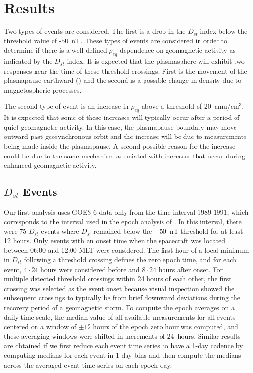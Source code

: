 \documentclass[12pt]{article}
\begin{document}
\section{Results}

Two types of events are considered. The first is a drop in the $D_{st}$ index below the threshold value of -50~nT. These types of events are considered in order to determine if there is a well-defined $\rho_{eq}$ dependence on geomagnetic activity as indicated by the $D_{st}$ index.  It is expected that the plasmasphere will exhibit two responses near the time of these threshold crossings.  First is the movement of the plasmapause earthward (\cite{LemaireEarthsPlasmasphere}) and the second is a possible change in density due to magnetospheric processes. 

The second type of event is an increase in $\rho_{eq}$ above a threshold of 20~amu/cm$^3$.  It is expected that some of these increases will typically occur after a period of quiet geomagnetic activity.  In this case, the plasmapause boundary may move outward past geosynchronous orbit and the increase will be due to measurements being made inside the plasmapause.  A second possible reason for the increase could be due to the same mechanism associated with increases that occur during enhanced geomagnetic activity.

\subsection{$D_{st}$ Events}

Our first analysis uses GOES-6 data only from the time interval 1989-1991, which corresponds to the interval used in the epoch analysis of \cite{Takahashi2010}. In this interval, there were 75 $D_{st}$ events where $D_{st}$ remained below the $-50$~nT threshold for at least 12 hours. Only events with an onset time when the spacecraft was located between 06:00 and 12:00 MLT were considered. The first hour of a local minimum in $D_{st}$ following a threshold crossing defines the zero epoch time, and for each event, $4\cdot24$ hours were considered before and $8\cdot24$ hours after onset. For multiple detected threshold crossings within 24 hours of each other, the first crossing was selected as the event onset because visual inspection showed the subsequent crossings to typically be from brief downward deviations during the recovery period of a geomagnetic storm. To compute the epoch averages on a daily time scale, the median value of all available measurements for all events centered on a window of $\pm 12$ hours of the epoch zero hour was computed, and these averaging windows were shifted in increments of $24$~hours. Similar results are obtained if we first reduce each event time series to have a 1-day cadence by computing medians for each event in 1-day bins and then compute the medians across the averaged event time series on each epoch day. 
\end{document}

